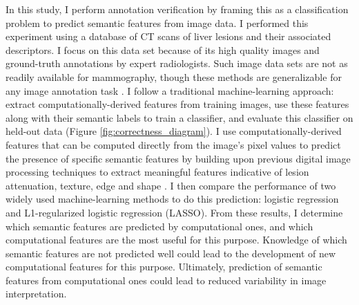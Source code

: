 In this study, I perform annotation verification by framing this as a classification problem to predict semantic features from image data.
I performed this experiment using a database of CT scans of liver lesions and their associated descriptors.
I focus on this data set because of its high quality images and ground-truth annotations by expert radiologists.
Such image data sets are not as readily available for mammography, though these methods are generalizable for any image annotation task \cite{Deselaers:2008gk}.
I follow a traditional machine-learning approach: extract computationally-derived features from training images, use these features along with their semantic labels to train a classifier, and evaluate this classifier on held-out data (Figure \ref{fig:correctness_diagram}). 
I use computationally-derived features that can be computed directly from the image's pixel values to predict the presence of specific semantic features by building upon previous digital image processing techniques to extract meaningful features indicative of lesion attenuation, texture, edge and shape \cite{Strela:2002vq,Zhao:2005wb,Hong:2006ti,Manay:2006un,MRangayyan:2005td,Xu:2012bh}. I then compare the performance of two widely used machine-learning methods to do this prediction: logistic regression and L1-regularized logistic regression (LASSO). From these results, I determine which semantic features are predicted by computational ones, and which computational features are the most useful for this purpose. Knowledge of which semantic features are not predicted well could lead to the development of new computational features for this purpose. Ultimately, prediction of semantic features from computational ones could lead to reduced variability in image interpretation.




